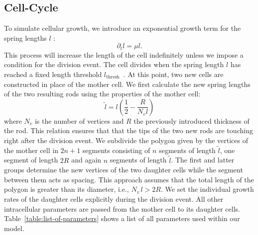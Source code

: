 \subsection{Cell-Cycle}
To simulate cellular growth, we introduce an exponential growth term for the spring lengths
$l$ \cite{Takeuchi2005}:
\begin{equation}
    \partial_t l = \mu l.
\end{equation}
This process will increase the length of the cell indefinitely unless we impose a condition for the
division event.
The cell divides when the spring length $l$ has reached a fixed length threshold
$l_\text{thresh}$~\cite{Robert2014}.
At this point, two new cells are constructed in place of the mother cell.
We first calculate the new spring lengths of the two resulting rods using the properties of the
mother cell:
\begin{equation}
    \tilde{l} = l\left(\frac{1}{2} - \frac{R}{N_v l}\right)
\end{equation}
where $N_v$ is the number of vertices and $R$ the previously introduced thickness of the rod.
This relation ensures that that the tips of the two new rods are touching right after the division
event.
We subdivide the polygon given by the vertices of the mother cell in $2n+1$ segments consisting of
$n$ segments of length $\tilde{l}$, one segment of length $2R$ and again $n$ segments of length
$\tilde{l}$.
The first and latter groups determine the new vertices of the two daughter cells while the segment
between them acts as spacing.
This approach assumes that the total length of the polygon is greater than its diameter,
i.e., $N_v\,l>2R$.
We set the individual growth rates of the daughter cells explicitly during the division event.
All other intracellular parameters are passed from the mother cell to its daughter cells.
Table~\ref{table:list-of-parameters} shows a list of all parameters used within our model.

